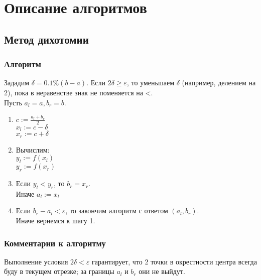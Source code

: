 \section{Описание алгоритмов}
\subsection{Метод дихотомии}
\subsubsection{Алгоритм}
Зададим $\delta=0.1\%(b-a)$. Если $2\delta\geq\varepsilon$, то уменьшаем $\delta$ (например, делением на 2), пока в неравенстве знак не поменяется на <.\\
Пусть $a_l = a, b_r=b$.
\begin{enumerate}
  \item $c := \frac{a_l+b_r}{2}$\\
  $x_l := c - \delta$\\
  $x_r := c + \delta$
  \item Вычислим:\\
  $y_l := f(x_l)$\\
  $y_r := f(x_r)$
  \item Если $y_l < y_r$, то $b_r = x_r$.\\
  Иначе $a_l := x_l$
  \item Если $b_r - a_l < \varepsilon$, то закончим алгоритм с ответом $(a_l, b_r)$.\\
  Иначе вернемся к шагу 1. 
\end{enumerate}

\subsubsection{Комментарии к алгоритму}
Выполнение условия $2\delta<\varepsilon$ гарантирует, что 2 точки в окрестности центра всегда буду в текущем отрезке; за границы $a_l$ и $b_r$ они не выйдут.

